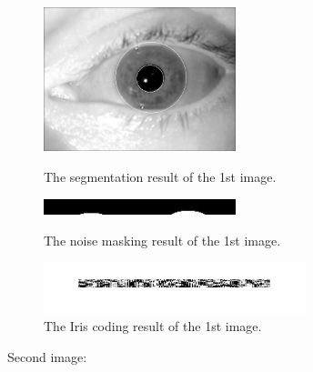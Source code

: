 \documentclass[a4paper]{article}
\begin{document}
\begin{spacing}{2.0}
\begin{enumerate}
	\begin{figure}[h]
	\begin{minipage}[t]{0.3\linewidth}
	\centering
	\includegraphics[width = 2.2in]{fprobe1segmented.jpg}
	\caption{The segmentation result of the 1st image.}
	\label{seg}
	\end{minipage}
	\begin{minipage}[t]{0.3\linewidth}
	\centering
	\includegraphics[width = 2.2in]{fprobe1polarnoise.jpg}
	\caption{The noise masking result of the 1st image.}
	\label{noiseM}
	\end{minipage}
	\begin{minipage}[t]{0.3\linewidth}
	\centering
	\includegraphics[width = 3in]{firiscoding1.jpg}
	\caption{The Iris coding result of the 1st image.}
	\label{IC}
	\end{minipage}
	\end{figure}
	
	Second image:\\
	

\end{enumerate}
\end{spacing}
\end{document}
